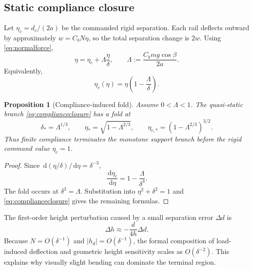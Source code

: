 \documentclass[11pt]{article}
\numberwithin{equation}{section}
\newtheorem{proposition}{Proposition}[section]
\theoremstyle{definition}
\theoremstyle{remark}
\newcommand{\dd}{\,\mathrm{d}}
\begin{document}
\subsection{Static compliance closure}

Let $\eta_c=d_c/(2a)$ be the commanded rigid separation.  Each rail deflects outward by approximately $w=C_bN\eta$, so the total separation change is $2w$.  Using \cref{eq:normalforce},
\begin{equation}
  \eta
  =\eta_c+\Lambda\frac{\eta}{\delta},
  \qquad
  \Lambda:=\frac{C_bmg\cos\beta}{2a}.
  \label{eq:complianceimplicit}
\end{equation}
Equivalently,
\begin{equation}
  \eta_c(\eta)=\eta\left(1-\frac{\Lambda}{\delta}\right).
  \label{eq:complianceclosure}
\end{equation}

\begin{proposition}[Compliance-induced fold]
\label{prop:fold}
Assume $0<\Lambda<1$.  The quasi-static branch \cref{eq:complianceclosure} has a fold at
\begin{equation}
  \delta_*=\Lambda^{1/3},
  \qquad
  \eta_*=\sqrt{1-\Lambda^{2/3}},
  \qquad
  \eta_{c,*}=\left(1-\Lambda^{2/3}\right)^{3/2}.
  \label{eq:fold}
\end{equation}
Thus finite compliance terminates the monotone support branch before the rigid command value $\eta_c=1$.
\end{proposition}

\begin{proof}
Since $\dd(\eta/\delta)/\dd\eta=\delta^{-3}$,
\begin{equation}
  \frac{\dd\eta_c}{\dd\eta}=1-\frac{\Lambda}{\delta^3}.
\end{equation}
The fold occurs at $\delta^3=\Lambda$.  Substitution into $\eta^2+\delta^2=1$ and \cref{eq:complianceclosure} gives the remaining formulas.
\end{proof}

The first-order height perturbation caused by a small separation error $\Delta d$ is
\begin{equation}
  \Delta h\approx-\frac{d}{4h}\Delta d.
  \label{eq:heightamplification}
\end{equation}
Because $N=O(\delta^{-1})$ and $|h_d|=O(\delta^{-1})$, the formal composition of load-induced deflection and geometric height sensitivity scales as $O(\delta^{-2})$.  This explains why visually slight bending can dominate the terminal region.
\end{document}
